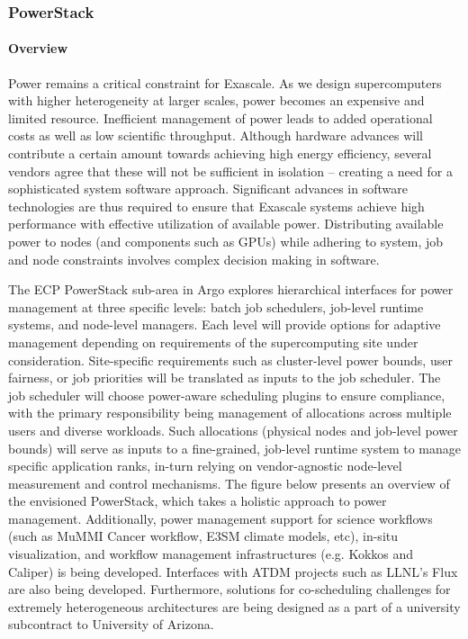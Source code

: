 \subsubsection*{PowerStack}

\paragraph{Overview} 
Power remains a critical constraint for Exascale. As we design supercomputers with higher heterogeneity at larger scales, power becomes an expensive and limited resource. Inefficient management of power leads to added operational costs as well as low scientific throughput. Although hardware advances will contribute a certain amount towards achieving high energy efficiency, several vendors agree that these will not be sufficient in isolation -- creating a need for a sophisticated system software approach. Significant advances in software technologies are thus required to ensure that Exascale systems achieve high performance with effective utilization of available power. Distributing available power to nodes (and components such as GPUs) while adhering to system, job and node constraints involves complex decision making in software. 

The ECP PowerStack sub-area in Argo explores hierarchical interfaces for power management at three specific levels: batch job schedulers, job-level runtime systems, and node-level managers. Each level will provide options for adaptive management depending on requirements of the supercomputing site under consideration. Site-specific requirements such as cluster-level power bounds, user fairness, or job priorities will be translated as inputs to the job scheduler. The job scheduler will choose power-aware scheduling plugins to ensure compliance, with the primary responsibility being management of allocations across multiple users and diverse workloads. Such allocations (physical nodes and job-level power bounds) will serve as inputs to a fine-grained, job-level runtime system to manage specific application ranks, in-turn relying on vendor-agnostic node-level measurement and control mechanisms. The figure below presents an overview of the envisioned PowerStack, which takes a holistic approach to power management.  Additionally, power management support for science workflows (such as MuMMI Cancer workflow, E3SM climate models, etc), in-situ visualization, and workflow management infrastructures (e.g. Kokkos and Caliper) is being developed. Interfaces with ATDM projects such as LLNL's Flux are also being developed. Furthermore, solutions for co-scheduling challenges for extremely heterogeneous architectures are being designed as a part of a university subcontract to University of Arizona. 

